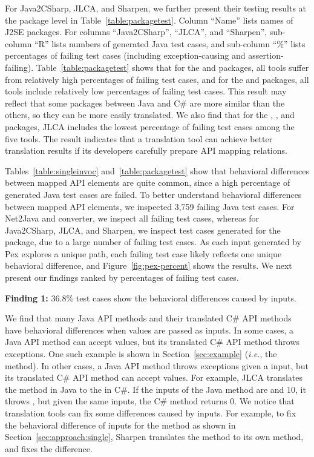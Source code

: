 For Java2CSharp, JLCA, and Sharpen, we further present their testing results at the package level in Table~\ref{table:packagetest}. Column ``Name'' lists names of J2SE packages. For columns ``Java2CSharp'', ``JLCA'', and ``Sharpen'', sub-column ``R'' lists numbers of generated Java test cases, and sub-column ``\%'' lists percentages of failing test cases (including exception-causing and assertion-failing). Table~\ref{table:packagetest} shows that for the  and  packages, all tools suffer from relatively high percentages of failing test cases, and for the  and  packages, all tools include relatively low percentages of failing test cases. This result may reflect that some packages between Java and C\# are more similar than the others, so they can be more easily translated. We also find that for the , , and  packages, JLCA includes the lowest percentage of failing test cases among the five tools. The result indicates that a translation tool can achieve better translation results if its developers carefully prepare API mapping relations.

Tables~\ref{table:singleinvoc} and~\ref{table:packagetest} show that behavioral differences between mapped API elements are quite common, since a high percentage of generated Java test cases are failed. To better understand behavioral differences between mapped API elements, we inspected 3,759 failing Java test cases. For Net2Java and converter, we inspect all failing test cases, whereas for Java2CSharp, JLCA, and Sharpen, we inspect test cases generated for the  package, due to a large number of failing test cases. As each input generated by Pex explores a unique path, each failing test case likely reflects one unique behavioral difference, and Figure~\ref{fig:pex-percent} shows the results. We next present our findings ranked by percentages of failing test cases.


\textbf{Finding 1:} 36.8\% test cases show the behavioral differences caused by  inputs.

We find that many Java API methods and their translated C\# API methods have behavioral differences when  values are passed as inputs. In some cases, a Java API method can accept  values, but its translated C\# API method throws exceptions. One such example is shown in Section~\ref{sec:example} (\emph{i.e.}, the  method). In other cases, a Java API method throws exceptions given a  input, but its translated C\# API method can accept  values. For example, JLCA translates the  method in Java to the  in C\#. If the inputs of the Java method are  and $10$, it throws , but given the same inputs, the C\# method returns 0. We notice that translation tools can fix some differences caused by  inputs. For example, to fix the behavioral difference of  inputs for the  method as shown in Section~\ref{sec:approach:single}, Sharpen translates the method to its own method, and fixes the difference.

